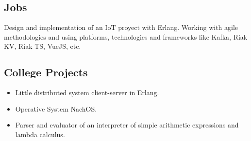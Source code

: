 \documentclass[10pt,a4paper]{moderncv}        %
\begin{document}
  \subsection{Jobs}
  {Design and implementation of an IoT proyect with Erlang. Working with agile methodologies and\newline
  {using platforms, technologies and frameworks like Kafka, Riak KV, Riak TS, VueJS, etc.}
}
  \subsection{College Projects}
    \begin{itemize}
      \item Little distributed system client-server in Erlang.
      \item Operative System NachOS.
      \item Parser and evaluator of an interpreter of simple arithmetic expressions and lambda calculus.
    \end{itemize}
\end{document}
